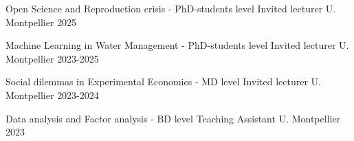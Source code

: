


\begin{cvhonors}

  \cvhonor
    {Open Science and Reproduction crisis - PhD-students level} %
    {Invited lecturer} %
    {U. Montpellier} %
    {2025} %

  \cvhonor
    {Machine Learning in Water Management - PhD-students level} %
    {Invited lecturer} %
    {U. Montpellier} %
    {2023-2025} %

  \cvhonor
    {Social dilemmas in Experimental Economics - MD level} %
    {Invited lecturer} %
    {U. Montpellier} %
    {2023-2024} %

  \cvhonor
    {Data analysis and Factor analysis - BD level} %
    {Teaching Assistant} %
    {U. Montpellier} %
    {2023} %


\end{cvhonors}
